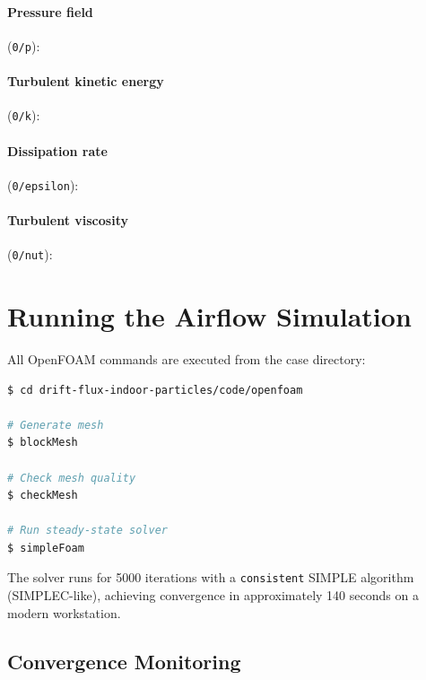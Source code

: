 \documentclass[12pt]{article}
\begin{document}
\paragraph{Pressure field} (\texttt{0/p}):


\paragraph{Turbulent kinetic energy} (\texttt{0/k}):


\paragraph{Dissipation rate} (\texttt{0/epsilon}):


\paragraph{Turbulent viscosity} (\texttt{0/nut}):


\section{Running the Airflow Simulation}

All OpenFOAM commands are executed from the case directory:

\begin{lstlisting}[language=bash]
$ cd drift-flux-indoor-particles/code/openfoam

# Generate mesh
$ blockMesh

# Check mesh quality
$ checkMesh

# Run steady-state solver
$ simpleFoam
\end{lstlisting}

\noindent The solver runs for 5000 iterations with a \texttt{consistent} SIMPLE algorithm (SIMPLEC-like), achieving convergence in approximately 140 seconds on a modern workstation.

\subsection{Convergence Monitoring}
\end{document}
